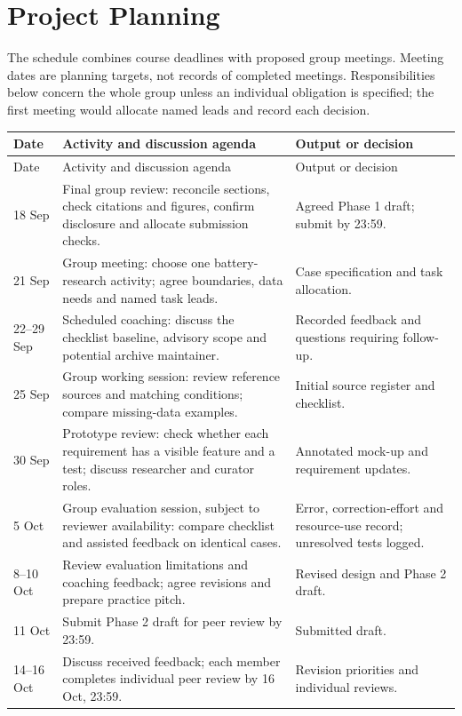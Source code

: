 \documentclass[11pt,a4paper]{article}
\begin{document}
\clearpage
\section{Project Planning}
The schedule combines course deadlines with proposed group meetings. Meeting dates are planning targets, not records of completed meetings. Responsibilities below concern the whole group unless an individual obligation is specified; the first meeting would allocate named leads and record each decision.

{\small
\begin{longtable}{@{}p{}p{}p{}@{}}
\toprule Date & Activity and discussion agenda & Output or decision \\
\midrule\endfirsthead
\toprule Date & Activity and discussion agenda & Output or decision \\
\midrule\endhead
18 Sep & Final group review: reconcile sections, check citations and figures, confirm disclosure and allocate submission checks. & Agreed Phase 1 draft; submit by 23:59. \\
\midrule
21 Sep & Group meeting: choose one battery-research activity; agree boundaries, data needs and named task leads. & Case specification and task allocation. \\
\midrule
22--29 Sep & Scheduled coaching: discuss the checklist baseline, advisory scope and potential archive maintainer. & Recorded feedback and questions requiring follow-up. \\
\midrule
25 Sep & Group working session: review reference sources and matching conditions; compare missing-data examples. & Initial source register and checklist. \\
\midrule
30 Sep & Prototype review: check whether each requirement has a visible feature and a test; discuss researcher and curator roles. & Annotated mock-up and requirement updates. \\
\midrule
5 Oct & Group evaluation session, subject to reviewer availability: compare checklist and assisted feedback on identical cases. & Error, correction-effort and resource-use record; unresolved tests logged. \\
\midrule
8--10 Oct & Review evaluation limitations and coaching feedback; agree revisions and prepare practice pitch. & Revised design and Phase 2 draft. \\
\midrule
11 Oct & Submit Phase 2 draft for peer review by 23:59. & Submitted draft. \\
\midrule
14--16 Oct & Discuss received feedback; each member completes individual peer review by 16 Oct, 23:59. & Revision priorities and individual reviews. \\

\end{longtable}}
\end{document}
